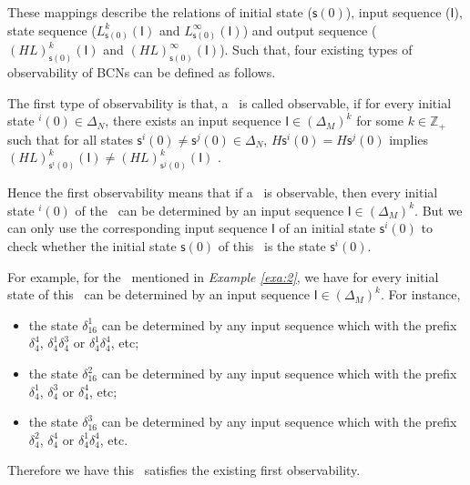 These mappings describe the relations of initial state ($\mathsf{s}(0)$), input sequence ($\mathsf{I}$), state sequence ($L^k_{\mathsf{s}(0)}(\mathsf{I})$ and $L^{\infty}_{\mathsf{s}(0)}(\mathsf{I})$) and output sequence ($(HL)^k_{\mathsf{s}(0)}(\mathsf{I})$ and $(HL)^{\infty}_{\mathsf{s}(0)}(\mathsf{I})$). Such that, four existing types of observability of BCNs can be defined as follows.
\begin{definition} 
The first type of observability is that, a \BCN\ is called observable, if for every initial state \State$^{i}(0)$$\in \Delta_N$, there exists an input sequence $\mathsf{I}\in(\Delta_M)^k$ for some $k\in \mathbb{Z}_+$ such that for all states $\mathsf{s}^{i}(0)\neq \mathsf{s}^{j}(0)\in \Delta_N$, $H\mathsf{s}^{i}(0)=H\mathsf{s}^{j}(0)$ implies $(HL)^k_{\mathsf{s}^{i}(0)}(\mathsf{I})\neq (HL)^k_{{\mathsf{s}^{j}(0)}}(\mathsf{I})$ \cite{cheng2009controllability}.
\end{definition}

Hence the first observability means that if a \BCN\ is observable, then every initial state \State$^{i}(0)$ of the \BCN\ can be determined by an input sequence $\mathsf{I}\in(\Delta_M)^k$. But we can only use the corresponding input sequence $\mathsf{I}$ of an initial state $\mathsf{s}^{i}(0)$ to check whether the initial state $\mathsf{s}(0)$ of this \BCN\ is the state $\mathsf{s}^{i}(0)$.
\begin{example}
For example, for the \BCN\ mentioned in {\em Example \ref{exa:2}}, we have for every initial state of this \BCN\ can be determined by an input sequence $\mathsf{I}\in(\Delta_M)^k$.  For instance,
\begin{itemize}
  \item the state $\delta_{16}^1$ can be determined by any input sequence which with the prefix $\delta_{4}^4$, $\delta_{4}^1  \delta_{4}^3$ or $\delta_{4}^1 \delta_{4}^4$, etc;
  \item the state $\delta_{16}^2$ can be determined by any input sequence which with the prefix $\delta_{4}^1$, $\delta_{4}^3$ or $\delta_{4}^4$, etc;
  \item the state $\delta_{16}^3$ can be determined by any input sequence which with the prefix $\delta_{4}^2$, $\delta_{4}^4$ or $\delta_{4}^1 \delta_{4}^4$, etc.
\end{itemize} 

Therefore we have this \BCN\ satisfies the existing first observability.
\label{exa:4}
\end{example}   


